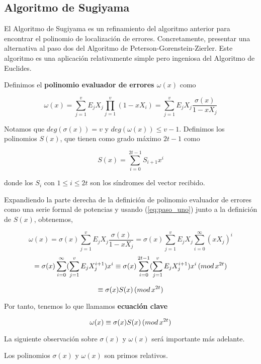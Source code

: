 \subsection{Algoritmo de Sugiyama}

El Algoritmo de Sugiyama es un refinamiento del algoritmo anterior para encontrar el polinomio de localización de errores. Concretamente, presentar una alternativa al paso dos del Algoritmo de Peterson-Gorenstein-Zierler. Este algoritmo es una aplicación relativamente simple pero ingeniosa del Algoritmo de Euclides.

\begin{definition}
Definimos el \textbf{polinomio evaluador de errores $\omega(x)$} como

\[
\omega(x) = \sum_{j=1}^v E_jX_j \prod_{j=1}^v (1-xX_i) = \sum_{j=1}^v E_jX_j \frac{\sigma(x)}{1-xX_j}
\]

\end{definition}

Notamos que $deg(\sigma(x)) = v$ y $deg(\omega(x)) \leq v-1$. Definimos los polinomios $S(x)$, que tienen como grado máximo $2t-1$ como 

\[
S(x) = \sum_{i=0}^{2t-1} S_{i+1}x^i
\]

donde los $S_i$ con $ 1 \leq i \leq 2t$ son los síndromes del vector recibido.

Expandiendo la parte derecha de la definición de polinomio evaluador de errores como una serie formal de potencias y usando (\ref{eq:paso_uno}) junto a la definición de $S(x)$, obtenemos,

\[ 
\omega(x) = \sigma(x)\sum_{j=1}^v E_jX_j \frac{\sigma(x)}{1-xX_j} = \sigma(x) \sum_{j=1}^v E_jX_j \sum_{i=0}^\infty (xX_j)^i 
\]
\[
 = \sigma(x) \sum_{i=0}^\infty ( \sum_{j=1}^v E_jX_j^{i+1})x^i \equiv \sigma(x) \sum_{i=0}^{2t-1} ( \sum_{j=1}^v E_jX_j^{i+1})x^i \thinspace (mod \thinspace x^{2t})  \]
 
 \[ \equiv \sigma(x)S(x) \thinspace (mod \thinspace x^{2t}) \]

Por tanto, tenemos lo que llamamos \textbf{ecuación clave}


\[ \omega(x) \equiv \sigma(x)S(x) \thinspace (mod \thinspace x^{2t}) \]

La siguiente observación sobre $\sigma(x)$ y $\omega(x)$ será importante más adelante.

\begin{lemma}
\label{le:primos_ec_clave}
Los polinomios $\sigma(x)$ y $\omega(x)$ son primos relativos.
\end{lemma}

